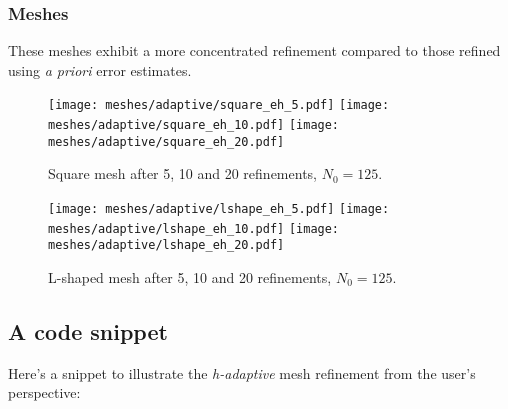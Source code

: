 \newpage
\subsubsection{Meshes}

These meshes exhibit a more concentrated refinement compared to those refined using \textit{a priori} error estimates.

\begin{figure}[!ht]
	\centering
	\texttt{[image: meshes/adaptive/square\_eh\_5.pdf]}
	\texttt{[image: meshes/adaptive/square\_eh\_10.pdf]}
	\texttt{[image: meshes/adaptive/square\_eh\_20.pdf]}
	\caption{Square mesh after 5, 10 and 20 refinements, $N_0 = 125$.}
\end{figure}

\begin{figure}[!ht]
	\centering
	\texttt{[image: meshes/adaptive/lshape\_eh\_5.pdf]}
	\texttt{[image: meshes/adaptive/lshape\_eh\_10.pdf]}
	\texttt{[image: meshes/adaptive/lshape\_eh\_20.pdf]}
	\caption{L-shaped mesh after 5, 10 and 20 refinements, $N_0 = 125$.}
\end{figure}

\newpage
\subsection{A code snippet}

Here's a snippet to illustrate the \textit{h-adaptive} mesh refinement from the user's perspective:

